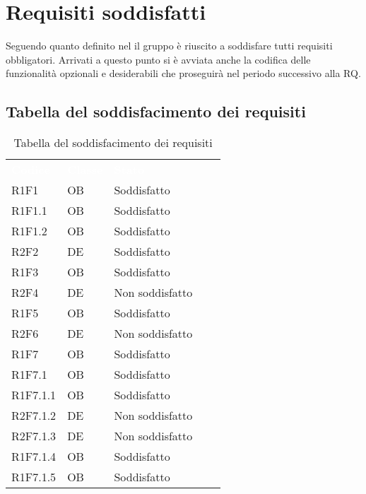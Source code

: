 \section{Requisiti soddisfatti}
Seguendo quanto definito nel  il gruppo è riuscito a soddisfare tutti requisiti obbligatori. Arrivati a questo punto si è avviata anche la codifica delle funzionalità opzionali e desiderabili che proseguirà nel periodo successivo alla RQ. 
\subsection{Tabella del soddisfacimento dei requisiti}
\renewcommand{\arraystretch}{1.5}	 
{
\setlength\arrayrulewidth{1pt}
\begin{longtable}{C{2.5cm} C{2cm} C{3.5cm}}
		\textcolor{white}{\textbf{Codice}} &
		\textcolor{white}{\textbf{Classe}} &
		\textcolor{white}{\textbf{Stato}} 
		\endfirsthead
	    		\\
	    \endfoot
	    \caption{Tabella del soddisfacimento dei requisiti}
	    \endlastfoot

R1F1 & OB & Soddisfatto\\
R1F1.1 & OB & Soddisfatto\\
R1F1.2 & OB & Soddisfatto\\

R2F2 & DE & Soddisfatto\\

R1F3 & OB & Soddisfatto\\

R2F4 & DE & Non soddisfatto\\
R1F5 & OB & Soddisfatto\\
R2F6 & DE & Non soddisfatto\\
R1F7 & OB & Soddisfatto\\
R1F7.1 & OB & Soddisfatto\\
R1F7.1.1 & OB & Soddisfatto\\
R2F7.1.2 & DE & Non soddisfatto\\
R2F7.1.3 & DE & Non soddisfatto\\

R1F7.1.4 & OB & Soddisfatto\\

R1F7.1.5 & OB & Soddisfatto\\


\end{longtable}}
